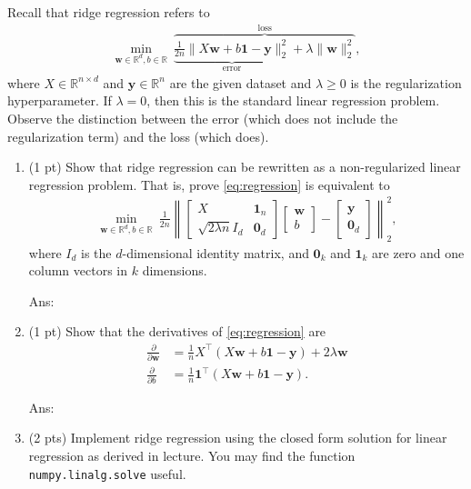 \documentclass[10pt,letter,notitlepage]{article}
\newcommand{\RR}{\mathds{R}}
\newcommand{\zero}{\mathbf{0}}
\newcommand{\one}{\mathbf{1}}
\newcommand{\wv}{\mathbf{w}}
\newcommand{\yv}{\mathbf{y}}
\newcommand{\ans}[1]{{\color{orange}\textsf{Ans}: #1}}
\newcounter{exercise}
\begin{document}
\begin{exercise}
Recall that ridge regression refers to
\begin{align}
  \min_{\wv\in \RR^d, b\in \RR} ~ \overbrace{\underbrace{\tfrac{1}{2n} \|X \wv+ b\one - \yv\|_2^2}_{\mbox{error}} + \lambda \|\wv\|_2^2}^{\mbox{loss}}, \label{eq:regression}
\end{align}
where $X \in \RR^{n \times d}$ and $\yv \in \RR^n$ are the given dataset and $\lambda \geq 0$ is the regularization hyperparameter.
If $\lambda = 0$, then this is the standard linear regression problem.
  Observe the distinction between the error (which does not include the regularization term) and the loss (which does).

\begin{enumerate}
  \item (1 pt) Show that ridge regression can be rewritten as a non-regularized linear regression problem.
  That is, prove \ref{eq:regression} is equivalent to 
\begin{align}
  \min_{\wv\in \RR^d, b\in \RR} ~ \tfrac{1}{2n} \left\|\begin{bmatrix}
X & \one_n \\
    \sqrt{2\lambda n}I_d & \zero_d
    \end{bmatrix} \begin{bmatrix} \wv  \\ b\end{bmatrix}  - \begin{bmatrix}\yv \\ \zero_d\end{bmatrix}\right\|_2^2 , 
\end{align}
where $I_d$ is the $d$-dimensional identity matrix, and $\zero_k$ and $\one_k$ are zero and one column vectors in $k$ dimensions.

    \ans{}

\item (1 pt) Show that the derivatives of \ref{eq:regression} are
\begin{align}
\frac{\partial}{\partial\wv} &=  \tfrac1n X^\top (X\wv + b\one - \yv) + 2 \lambda \wv\\
\label{eq:b}
\frac{\partial}{\partial b} &= \tfrac1n \one^\top (X\wv + b\one - \yv).
\end{align}

    \ans{} 

  \item (2 pts) Implement ridge regression using the closed form solution for linear regression as derived in lecture. 
    You may find the function \texttt{numpy.linalg.solve} useful.


\end{enumerate}
\end{exercise}
\end{document}
